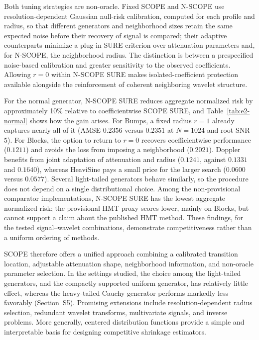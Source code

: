\documentclass[12pt]{article}
\theoremstyle{definition}
\theoremstyle{definition}
\begin{document}
Both tuning strategies are non-oracle. Fixed SCOPE and N-SCOPE
use resolution-dependent Gaussian null-risk calibration, computed for
each profile and radius, so that different generators and neighborhood
sizes retain the same expected noise before their recovery of signal is
compared; their
adaptive counterparts minimize a plug-in SURE criterion over
attenuation parameters and, for N-SCOPE, the neighborhood radius.
The distinction is between a prespecified noise-based calibration
and greater sensitivity to the observed coefficients. Allowing
$r=0$ within N-SCOPE SURE makes isolated-coefficient protection
available alongside the reinforcement of coherent neighboring
wavelet structure.

For the normal generator, N-SCOPE SURE reduces aggregate normalized
risk by approximately 10\% relative to coefficientwise SCOPE SURE, and
Table~\ref{tab:e2-normal} shows how the gain arises. For Bumps, a fixed
radius $r=1$ already captures nearly all of it (AMSE $0.2356$ versus
$0.2351$ at $N=1024$ and root SNR $5$). For Blocks, the option to return
to $r=0$ recovers coefficientwise performance ($0.1211$) and avoids the
loss from imposing a neighborhood ($0.2021$). Doppler benefits from
joint adaptation of attenuation and radius ($0.1241$, against $0.1331$
and $0.1640$), whereas HeaviSine pays a small price for the larger
search ($0.0600$ versus $0.0577$). Several light-tailed generators
behave similarly, so the procedure does not depend on a single
distributional choice. Among the non-provisional comparator
implementations, N-SCOPE SURE has the lowest aggregate normalized risk;
the provisional HMT proxy scores lower, mainly on Blocks, but cannot
support a claim about the published HMT method. These findings, for
the tested signal--wavelet combinations, demonstrate competitiveness
rather than a uniform ordering of methods.

SCOPE therefore offers a unified approach combining a calibrated
transition location, adjustable attenuation shape, neighborhood
information, and non-oracle parameter selection. In the settings
studied, the choice among the light-tailed generators, and the
compactly supported uniform generator, has relatively little effect,
whereas the heavy-tailed Cauchy generator performs markedly less
favorably (Section~S5).
Promising extensions include resolution-dependent radius selection,
redundant wavelet transforms, multivariate signals, and inverse
problems. More generally, centered distribution functions provide
a simple and interpretable basis for designing competitive
shrinkage estimators.
\end{document}
